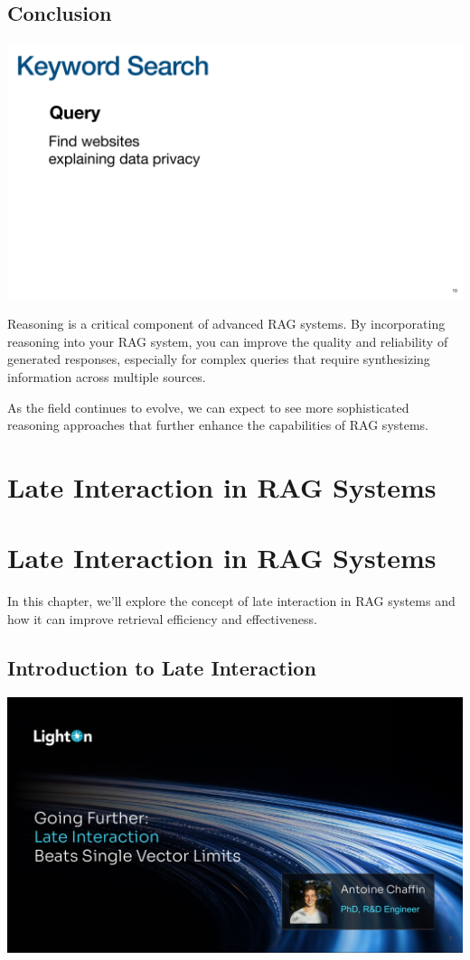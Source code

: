 \documentclass[
  letterpaper,
  oneside]{scrbook}
\begin{document}
\section{Conclusion}\label{conclusion-2}

\includegraphics{chapters/../p3-images/slide_12.png}

Reasoning is a critical component of advanced RAG systems. By
incorporating reasoning into your RAG system, you can improve the
quality and reliability of generated responses, especially for complex
queries that require synthesizing information across multiple sources.

As the field continues to evolve, we can expect to see more
sophisticated reasoning approaches that further enhance the capabilities
of RAG systems.

\chapter{Late Interaction in RAG
Systems}\label{late-interaction-in-rag-systems}

\chapter{Late Interaction in RAG
Systems}\label{late-interaction-in-rag-systems-1}

In this chapter, we'll explore the concept of late interaction in RAG
systems and how it can improve retrieval efficiency and effectiveness.

\section{Introduction to Late
Interaction}\label{introduction-to-late-interaction}

\includegraphics{chapters/../p4-images/slide_1.png}
\end{document}
